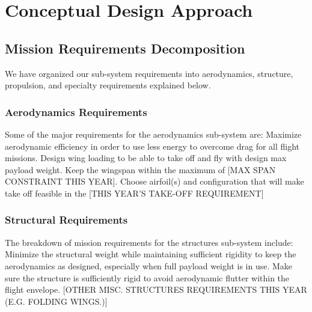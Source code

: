 \documentclass[proposal]{byu-aero}
\begin{document}

\section{Conceptual Design Approach} %
\label{sec:ConceptualDesign}



\subsection{Mission Requirements Decomposition}
\label{ssec:MissionReqs}

We have organized our sub-system requirements into aerodynamics, structure, propulsion, and specialty requirements explained below.

\subsubsection{Aerodynamics Requirements}
\label{sssec:AerodynamicReqs}

Some of the major requirements for the aerodynamics sub-system are: Maximize aerodynamic efficiency in order to use less energy to overcome drag for all flight missions.  Design wing loading to be able to take off and fly with design max payload weight.  Keep the wingspan within the maximum of {\color{BYUred}[MAX SPAN CONSTRAINT THIS YEAR]}.  Choose airfoil(s) and configuration that will make take off feasible in the {\color{BYUred}[THIS YEAR'S TAKE-OFF REQUIREMENT]}

\subsubsection{Structural Requirements}
\label{sssec:StructuralReqs}

The breakdown of mission requirements for the structures sub-system include: Minimize the structural weight while maintaining sufficient rigidity to keep the aerodynamics as designed, especially when full payload weight is in use.  Make sure the structure is sufficiently rigid to avoid aerodynamic flutter within the flight envelope. {\color{BYUred}[OTHER MISC. STRUCTURES REQUIREMENTS THIS YEAR (E.G. FOLDING WINGS.)]}
\end{document}
